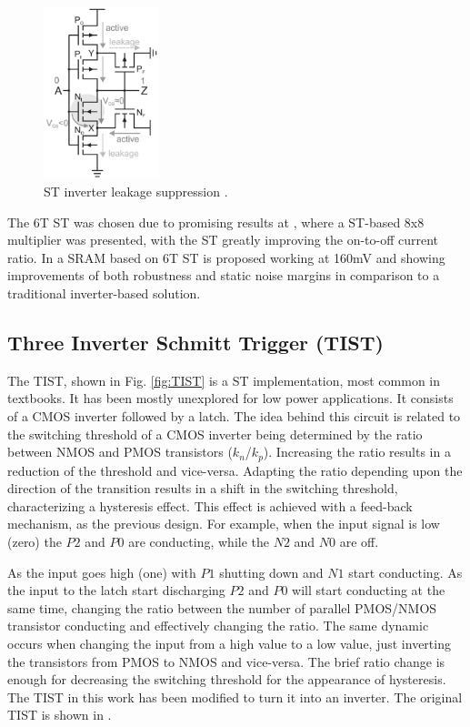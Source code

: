 \documentclass[diss,pgmicro,english]{iiufrgs}
\begin{document}
\begin{figure}[]
  \centering
    \includegraphics[width=0.3\textwidth]{ST.pdf}
     \caption{ST inverter leakage suppression \cite{lotze2017ultra}.}
  \label{fig:ST}
\end{figure}

The 6T ST was chosen due to promising results at \cite{lotze2017ultra}, where a ST-based 8x8 multiplier was presented, with the ST greatly improving the on-to-off current ratio. In \cite{kulkarni2007160} a SRAM based on 6T ST is proposed working at 160mV and showing improvements of both robustness and static noise margins in comparison to a traditional inverter-based solution.

\subsection{Three Inverter Schmitt Trigger (TIST)}

The TIST, shown in Fig. \ref{fig:TIST} is a ST implementation, most common in textbooks. It has been mostly unexplored for low power applications. It consists of a CMOS inverter followed by a latch. The idea behind this circuit is related to the switching threshold of a CMOS inverter being determined by the ratio between NMOS and PMOS transistors ($k_n$/$k_p$). Increasing the ratio results in a reduction of the threshold and vice-versa. Adapting the ratio depending upon the direction of the transition results in a shift in the switching threshold, characterizing a hysteresis effect. This effect is achieved with a feed-back mechanism, as the previous design. For example, when the input signal is low (zero) the $P2$ and $P0$ are conducting, while the $N2$ and $N0$ are off.

As the input goes high (one) with $P1$ shutting down and $N1$ start conducting. As the input to the latch start discharging $P2$ and $P0$ will start conducting at the same time, changing the ratio between the number of parallel PMOS/NMOS transistor conducting and effectively changing the ratio. The same dynamic occurs when changing the input from a high value to a low value, just inverting the transistors from PMOS to NMOS and vice-versa. The brief ratio change is enough for decreasing the switching threshold for the appearance of hysteresis. The TIST in this work has been modified to turn it into an inverter. The original TIST is shown in \cite{rabaey2003digital}.
\end{document}
